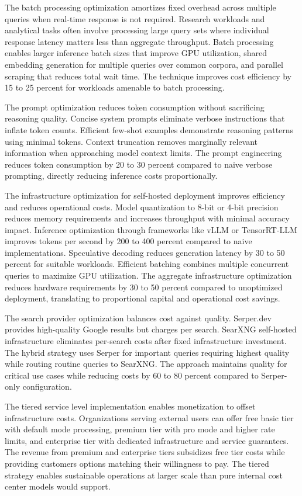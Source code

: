The batch processing optimization amortizes fixed overhead across multiple queries when real-time response is not required. Research workloads and analytical tasks often involve processing large query sets where individual response latency matters less than aggregate throughput. Batch processing enables larger inference batch sizes that improve GPU utilization, shared embedding generation for multiple queries over common corpora, and parallel scraping that reduces total wait time. The technique improves cost efficiency by 15 to 25 percent for workloads amenable to batch processing.

The prompt optimization reduces token consumption without sacrificing reasoning quality. Concise system prompts eliminate verbose instructions that inflate token counts. Efficient few-shot examples demonstrate reasoning patterns using minimal tokens. Context truncation removes marginally relevant information when approaching model context limits. The prompt engineering reduces token consumption by 20 to 30 percent compared to naive verbose prompting, directly reducing inference costs proportionally.

The infrastructure optimization for self-hosted deployment improves efficiency and reduces operational costs. Model quantization to 8-bit or 4-bit precision reduces memory requirements and increases throughput with minimal accuracy impact. Inference optimization through frameworks like vLLM or TensorRT-LLM improves tokens per second by 200 to 400 percent compared to naive implementations. Speculative decoding reduces generation latency by 30 to 50 percent for suitable workloads. Efficient batching combines multiple concurrent queries to maximize GPU utilization. The aggregate infrastructure optimization reduces hardware requirements by 30 to 50 percent compared to unoptimized deployment, translating to proportional capital and operational cost savings.

The search provider optimization balances cost against quality. Serper.dev provides high-quality Google results but charges per search. SearXNG self-hosted infrastructure eliminates per-search costs after fixed infrastructure investment. The hybrid strategy uses Serper for important queries requiring highest quality while routing routine queries to SearXNG. The approach maintains quality for critical use cases while reducing costs by 60 to 80 percent compared to Serper-only configuration.

The tiered service level implementation enables monetization to offset infrastructure costs. Organizations serving external users can offer free basic tier with default mode processing, premium tier with pro mode and higher rate limits, and enterprise tier with dedicated infrastructure and service guarantees. The revenue from premium and enterprise tiers subsidizes free tier costs while providing customers options matching their willingness to pay. The tiered strategy enables sustainable operations at larger scale than pure internal cost center models would support.

